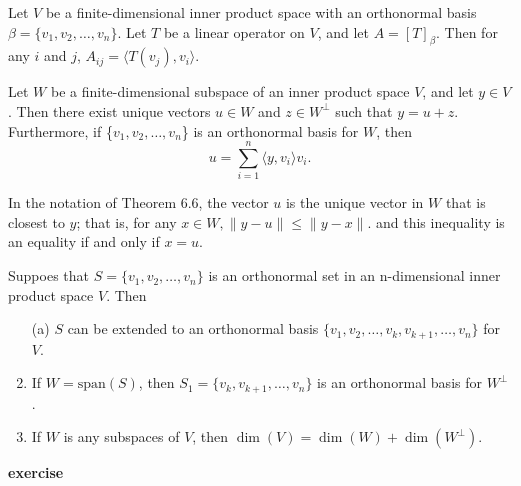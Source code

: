 \vspace{3cm}
\begin{corollary}
    Let \(V\) be a finite-dimensional inner product space with an orthonormal basis \(\beta = \{v_1, v_2, \dots , v_n\}\). Let \(T\) be a linear operator on \(V\), and let \(A = [T]_{\beta}\). Then for any \(i\) and \(j\), \(A_{ij} = \langle T(v_j), v_i \rangle\).
\end{corollary}
\vspace{3cm}
\begin{theorem}
    Let \(W\) be a finite-dimensional subspace of an inner product space \(V\), and let \(y\in V\). Then there exist unique vectors \(u \in W\) and \(z \in W^{\perp}\) such that \(y = u + z\).
    Furthermore, if \{\(v_1, v_2, \dots , v_n\)\} is an orthonormal basis for \(W\), then
    \[
    u = \sum_{i=1}^{n} \langle y, v_i \rangle v_i.
    \]
\end{theorem}
\vspace{5cm}
\begin{corollary}
    In the notation of Theorem 6.6, the vector \(u\) is the unique vector in \(W\) that is closest to \(y\); that is, for any \(x \in W, \lVert y - u \rVert \leq \lVert y - x \rVert\). and this inequality is an equality if and only if \(x = u\).
\end{corollary}
\newpage
\begin{theorem}
    Suppoes that \(S = \{v_1, v_2, \dots , v_n\}\) is an orthonormal set in an n-dimensional inner product space \(V\). Then
    \begin{enumerate}
        \item[(a)] \(S\) can be extended to an orthonormal basis \(\{v_1, v_2, \dots , v_k, v_{k+1}, \dots, v_n \}\) for \(V\).
        \item If \(W = \text{span}(S)\), then \( S_1 = \{v_k, v_{k+1}, \dots, v_n\} \) is an orthonormal basis for \(W^{\perp}\).
        \item If \(W\) is any subspaces of \(V\), then \( \dim(V)=\dim(W) + \dim(W^{\perp})\).
    \end{enumerate}
\end{theorem}
\vspace{7cm}
\textbf{exercise}

